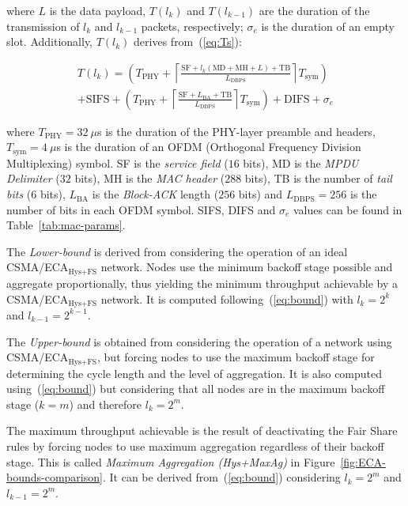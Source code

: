 	where $L$ is the data payload, $T(l_{k})$ and $T(l_{k-1})$ are the duration of the transmission of $l_{k}$ and $l_{k-1}$ packets, respectively; $\sigma_{e}$ is the duration of an empty slot. Additionally, $T(l_{k})$ derives from~(\ref{eq:Ts}):
	
	\begin{multline}\label{eq:Ts}
		T(l_{k})= \left( T_{\text{PHY}} + \left\lceil \frac{ \text{SF} + l_{k} (\text{MD}+\text{MH}+L) + \text{TB}}{L_{\text{DBPS}}}\right\rceil T_{\text{sym}} \right) \\ 
		+ \text{SIFS}+\left(T_{\text{PHY}} + \left\lceil\frac{\text{SF} + L_{\text{BA}} + \text{TB}}{L_{\text{DBPS}}} \right \rceil T_{\text{sym}} \right) + \text{DIFS} + \sigma_{e}
	\end{multline}
	
	where $T_{\text{PHY}}=32~\mu$s is the duration of the PHY-layer preamble and headers, $T_{\text{sym}}=4~\mu$s is the duration of an OFDM (Orthogonal Frequency Division Multiplexing) symbol. SF is the \emph{service field} ($16$ bits), $\text{MD}$ is the \textit{MPDU Delimiter} ($32$ bits), MH is the \emph{MAC header} ($288$ bits), TB is the number of \emph{tail bits} ($6$ bits), $L_{\text{BA}}$ is the \emph{Block-ACK} length ($256$ bits) and $L_{\text{DBPS}}=256$ is the number of bits in each OFDM symbol. SIFS, DIFS and $\sigma_{e}$ values can be found in Table~\ref{tab:mac-params}.

	The \emph{Lower-bound} is derived from considering the operation of an ideal CSMA/ECA$_{\text{Hys+FS}}$ network. Nodes use the minimum backoff stage possible and aggregate proportionally, thus yielding the minimum throughput achievable by a CSMA/ECA$_{\text{Hys+FS}}$ network. It is computed following~(\ref{eq:bound}) with $l_{k}=2^{k}$ and $l_{k-1}=2^{k-1}$.
	
	The \emph{Upper-bound} is obtained from considering the operation of a network using CSMA/ECA$_{\text{Hys+FS}}$, but forcing nodes to use the maximum backoff stage for determining the cycle length and the level of aggregation. It is also computed using~(\ref{eq:bound}) but considering that all nodes are in the maximum backoff stage ($k=m$) and therefore $l_{k}=2^{m}$.
	
	The maximum throughput achievable is the result of deactivating the Fair Share rules by forcing nodes to use maximum aggregation regardless of their backoff stage. This is called \emph{Maximum Aggregation (Hys+MaxAg)} in Figure~\ref{fig:ECA-bounds-comparison}. It can be derived from~(\ref{eq:bound}) considering $l_{k} = 2^{m}$ and $l_{k-1}=2^{m}$.
		
